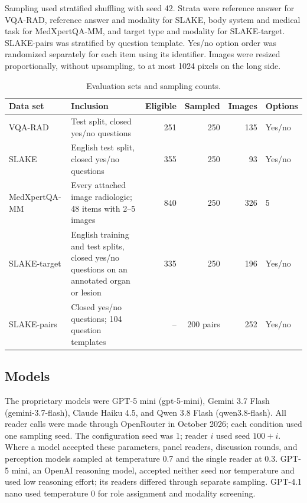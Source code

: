 Sampling used stratified shuffling with seed 42.
Strata were reference answer for VQA-RAD, reference answer and modality for SLAKE, body system and medical task for MedXpertQA-MM, and target type and modality for SLAKE-target.
SLAKE-pairs was stratified by question template.
Yes/no option order was randomized separately for each item using its identifier.
Images were resized proportionally, without upsampling, to at most 1024 pixels on the long side.

\begin{table}[!htbp]
\centering
\caption{Evaluation sets and sampling counts.}
\label{tab:sets}
\footnotesize
\setlength{\tabcolsep}{4pt}
\begin{tabular}{>{\raggedright\arraybackslash}p{}>{\raggedright\arraybackslash}p{}rrrl}
\toprule
Data set & Inclusion & Eligible & Sampled & Images & Options \\
\midrule
VQA-RAD & Test split, closed yes/no questions & 251 & 250 & 135 & Yes/no \\
SLAKE & English test split, closed yes/no questions & 355 & 250 & 93 & Yes/no \\
MedXpertQA-MM & Every attached image radiologic; 48 items with 2--5 images & 840 & 250 & 326 & 5 \\
SLAKE-target & English training and test splits, closed yes/no questions on an annotated organ or lesion & 335 & 250 & 196 & Yes/no \\
SLAKE-pairs & Closed yes/no questions; 104 question templates & -- & 200 pairs & 252 & Yes/no \\
\bottomrule
\end{tabular}
\end{table}

\subsection{Models}
The proprietary models were GPT-5 mini (gpt-5-mini), Gemini 3.7 Flash (gemini-3.7-flash), Claude Haiku 4.5, and Qwen 3.8 Flash (qwen3.8-flash).
All reader calls were made through OpenRouter in October 2026; each condition used one sampling seed.
The configuration seed was 1; reader $i$ used seed $100+i$.
Where a model accepted these parameters, panel readers, discussion rounds, and perception models sampled at temperature 0.7 and the single reader at 0.3.
GPT-5 mini, an OpenAI reasoning model, accepted neither seed nor temperature and used low reasoning effort; its readers differed through separate sampling.
GPT-4.1 nano used temperature 0 for role assignment and modality screening.

